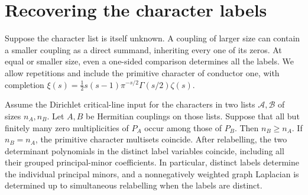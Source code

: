 \section{Recovering the character labels}
\label{sec:blind}

Suppose the character list is itself unknown. A coupling of larger size can contain a smaller coupling as a direct summand, inheriting every one of its zeros. At equal or smaller size, even a one-sided comparison determines all the labels. We allow repetitions and include the primitive character of conductor one, with completion $\xi(s)=\tfrac12 s(s-1)\pi^{-s/2}\Gamma(s/2)\zeta(s)$.

\begin{theorem}\label{thm:blind}
Assume the Dirichlet critical-line input for the characters in two lists $\mathcal A,\mathcal B$ of sizes $n_A,n_B$. Let $A,B$ be Hermitian couplings on those lists. Suppose that all but finitely many zero multiplicities of $P_A$ occur among those of $P_B$. Then $n_B\ge n_A$. If $n_B=n_A$, the primitive character multisets coincide. After relabelling, the two determinant polynomials in the distinct label variables coincide, including all their grouped principal-minor coefficients. In particular, distinct labels determine the individual principal minors, and a nonnegatively weighted graph Laplacian is determined up to simultaneous relabelling when the labels are distinct.
\end{theorem}

